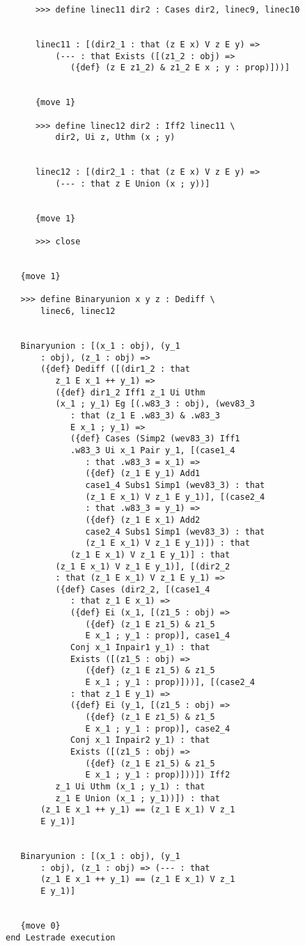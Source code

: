 \documentclass[12pt]{article}
\begin{document}
\begin{verbatim}
      >>> define linec11 dir2 : Cases dir2, linec9, linec10


      linec11 : [(dir2_1 : that (z E x) V z E y) => 
          (--- : that Exists ([(z1_2 : obj) => 
             ({def} (z E z1_2) & z1_2 E x ; y : prop)]))]


      {move 1}

      >>> define linec12 dir2 : Iff2 linec11 \
          dir2, Ui z, Uthm (x ; y)


      linec12 : [(dir2_1 : that (z E x) V z E y) => 
          (--- : that z E Union (x ; y))]


      {move 1}

      >>> close


   {move 1}

   >>> define Binaryunion x y z : Dediff \
       linec6, linec12


   Binaryunion : [(x_1 : obj), (y_1 
       : obj), (z_1 : obj) => 
       ({def} Dediff ([(dir1_2 : that 
          z_1 E x_1 ++ y_1) => 
          ({def} dir1_2 Iff1 z_1 Ui Uthm 
          (x_1 ; y_1) Eg [(.w83_3 : obj), (wev83_3 
             : that (z_1 E .w83_3) & .w83_3 
             E x_1 ; y_1) => 
             ({def} Cases (Simp2 (wev83_3) Iff1 
             .w83_3 Ui x_1 Pair y_1, [(case1_4 
                : that .w83_3 = x_1) => 
                ({def} (z_1 E y_1) Add1 
                case1_4 Subs1 Simp1 (wev83_3) : that 
                (z_1 E x_1) V z_1 E y_1)], [(case2_4 
                : that .w83_3 = y_1) => 
                ({def} (z_1 E x_1) Add2 
                case2_4 Subs1 Simp1 (wev83_3) : that 
                (z_1 E x_1) V z_1 E y_1)]) : that 
             (z_1 E x_1) V z_1 E y_1)] : that 
          (z_1 E x_1) V z_1 E y_1)], [(dir2_2 
          : that (z_1 E x_1) V z_1 E y_1) => 
          ({def} Cases (dir2_2, [(case1_4 
             : that z_1 E x_1) => 
             ({def} Ei (x_1, [(z1_5 : obj) => 
                ({def} (z_1 E z1_5) & z1_5 
                E x_1 ; y_1 : prop)], case1_4 
             Conj x_1 Inpair1 y_1) : that 
             Exists ([(z1_5 : obj) => 
                ({def} (z_1 E z1_5) & z1_5 
                E x_1 ; y_1 : prop)]))], [(case2_4 
             : that z_1 E y_1) => 
             ({def} Ei (y_1, [(z1_5 : obj) => 
                ({def} (z_1 E z1_5) & z1_5 
                E x_1 ; y_1 : prop)], case2_4 
             Conj x_1 Inpair2 y_1) : that 
             Exists ([(z1_5 : obj) => 
                ({def} (z_1 E z1_5) & z1_5 
                E x_1 ; y_1 : prop)]))]) Iff2 
          z_1 Ui Uthm (x_1 ; y_1) : that 
          z_1 E Union (x_1 ; y_1))]) : that 
       (z_1 E x_1 ++ y_1) == (z_1 E x_1) V z_1 
       E y_1)]


   Binaryunion : [(x_1 : obj), (y_1 
       : obj), (z_1 : obj) => (--- : that 
       (z_1 E x_1 ++ y_1) == (z_1 E x_1) V z_1 
       E y_1)]


   {move 0}
end Lestrade execution
\end{verbatim}
\end{document}
